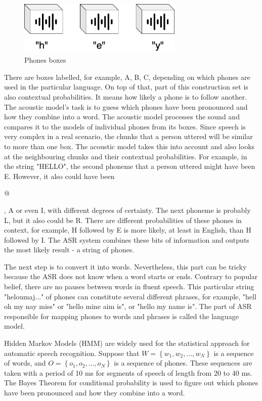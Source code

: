 \begin{figure}[H]
    \centering
    \includegraphics[width=0.7\textwidth]{img/phones_boxes.png}
    \caption{Phones boxes}
    \label{fig:phones_boxes}
\end{figure}

There are boxes labelled, for example, A, B, C, depending on which phones are used in the particular language. On top of that, part of this construction set is also contextual probabilities. It means how likely a phone is to follow another. The acoustic model's task is to guess which phones have been pronounced and how they combine into a word. The acoustic model processes the sound and compares it to the models of individual phones from its boxes. Since speech is very complex in a real scenario, the chunks that a person uttered will be similar to more than one box. The acoustic model takes this into account and also looks at the neighbouring chunks and their contextual probabilities. For example, in the string "HELLO", the second phoneme that a person uttered might have been E. However, it also could have been \begin{IPA}@\end{IPA}, A or even I, with different degrees of certainty. The next phoneme is probably L, but it also could be R. There are different probabilities of these phones in context, for example, H followed by E is more likely, at least in English, than H followed by I. The ASR system combines these bits of information and outputs the most likely result - a string of phones.\citep{stanislav_petr_2020}

The next step is to convert it into words. Nevertheless, this part can be tricky because the ASR does not know when a word starts or ends. Contrary to popular belief, there are no pauses between words in fluent speech. This particular string "heloumaj..." of phones can constitute several different phrases, for example, "hell oh my nay miss" or "hello mine aim is", or "hello my name is". The part of ASR responsible for mapping phones to words and phrases is called the language model.

Hidden Markov Models (HMM) are widely used for the statistical approach for automatic speech recognition. Suppose that \linebreak$W=\left\{w_{1}, w_{2}, \ldots, w_{N}\right\}$ is a sequence of words, and $O=\left\{o_{1}, o_{2}, \ldots, o_{N}\right\}$ is a sequence of phones. These sequences are taken with a period of 10 ms for segments of speech of length from 20 to 40 ms. The Bayes Theorem for conditional probability is used to figure out which phones have been pronounced and how they combine into a word.

